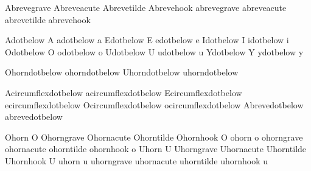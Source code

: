 Abrevegrave         {\Abreve}
 Abreveacute         {\Abreve}
 Abrevetilde         {\Abreve}
 Abrevehook          {\Abreve}
 abrevegrave         {\abreve}
 abreveacute         {\abreve}
 abrevetilde         {\abreve}
 abrevehook          {\abreve}

 Adotbelow           {\buildtextbottomdot A}
 adotbelow           {\buildtextbottomdot a}
 Edotbelow           {\buildtextbottomdot E}
 edotbelow           {\buildtextbottomdot e}
 Idotbelow           {\buildtextbottomdot I}
 idotbelow           {\buildtextbottomdot i}
 Odotbelow           {\buildtextbottomdot O}
 odotbelow           {\buildtextbottomdot o}
 Udotbelow           {\buildtextbottomdot U}
 udotbelow           {\buildtextbottomdot u}
 Ydotbelow           {\buildtextbottomdot Y}
 ydotbelow           {\buildtextbottomdot y}

 Ohorndotbelow       {\buildtextbottomdot\Ohorn}
 ohorndotbelow       {\buildtextbottomdot\ohorn}
 Uhorndotbelow       {\buildtextbottomdot\Uhorn}
 uhorndotbelow       {\buildtextbottomdot\uhorn}

 Acircumflexdotbelow {\buildtextbottomdot\Acircumflex}
 acircumflexdotbelow {\buildtextbottomdot\acircumflex}
 Ecircumflexdotbelow {\buildtextbottomdot\Ecircumflex}
 ecircumflexdotbelow {\buildtextbottomdot\ecircumflex}
 Ocircumflexdotbelow {\buildtextbottomdot\Ocircumflex}
 ocircumflexdotbelow {\buildtextbottomdot\ocircumflex}
 Abrevedotbelow      {\buildtextbottomdot\Abreve}
 abrevedotbelow      {\buildtextbottomdot\abreve}

 Ohorn               {O}
 Ohorngrave          {\Ograve}
 Ohornacute          {\Oacute}
 Ohorntilde          {\Otilde}
 Ohornhook           {O}
 ohorn               {o}
 ohorngrave          {\ograve}
 ohornacute          {\oacute}
 ohorntilde          {\otilde}
 ohornhook           {o}
 Uhorn               {U}
 Uhorngrave          {\Ugrave}
 Uhornacute          {\Uacute}
 Uhorntilde          {\Utilde}
 Uhornhook           {U}
 uhorn               {u}
 uhorngrave          {\ugrave}
 uhornacute          {\uacute}
 uhorntilde          {\utilde}
 uhornhook           {u}

